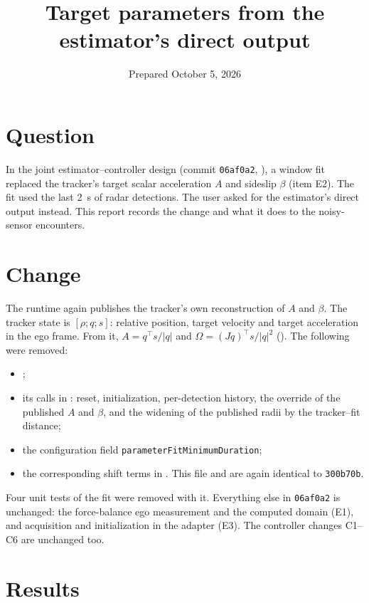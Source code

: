 \documentclass[11pt]{article}
\title{Target parameters from the estimator's direct output}
\date{Prepared October 5, 2026}
\begin{document}
\maketitle

\section{Question}
In the joint estimator--controller design (commit \texttt{06af0a2},
), a window fit replaced the tracker's target
scalar acceleration $A$ and sideslip $\beta$ (item E2). The fit used the last
2~s of radar detections. The user asked for the estimator's direct output
instead. This report records the change and what it does to the noisy-sensor
encounters.

\section{Change}
The runtime again publishes the tracker's own reconstruction of $A$ and
$\beta$. The tracker state is $[\rho;q;s]$: relative position, target velocity
and target acceleration in the ego frame. From it,
$A=q^\top s/|q|$ and $\Omega=(Jq)^\top s/|q|^2$
(). The following were removed:
\begin{itemize}
\item {};
\item its calls in : reset,
  initialization, per-detection history, the override of the published $A$ and
  $\beta$, and the widening of the published radii by the tracker--fit distance;
\item the configuration field \texttt{parameterFitMinimumDuration};
\item the corresponding shift terms in .
  This file and  are again identical to
  \texttt{300b70b}.
\end{itemize}
Four unit tests of the fit were removed with it. Everything else in
\texttt{06af0a2} is unchanged: the force-balance ego measurement and the
computed domain (E1), and acquisition and initialization in the adapter (E3).
The controller changes C1--C6 are unchanged too.

\section{Results}
\end{document}
